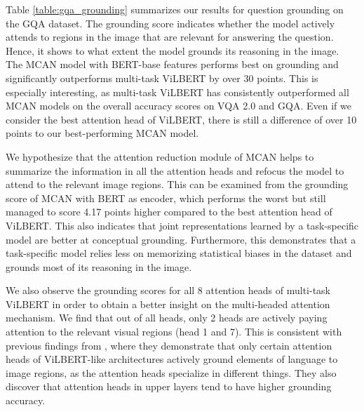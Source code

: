 \documentclass{article}
\begin{document}
Table \ref{table:gqa_grounding} summarizes our results for question grounding on the GQA dataset. The grounding score indicates whether the model actively attends to regions in the image that are relevant for answering the question. Hence, it shows to what extent the model grounds its reasoning in the image. The MCAN model with BERT-base features performs best on grounding and significantly outperforms multi-task ViLBERT by over 30 points. This is especially interesting, as multi-task ViLBERT has consistently outperformed all MCAN models on the overall accuracy scores on VQA 2.0 and GQA. Even if we consider the best attention head of ViLBERT, there is still a difference of over 10 points to our best-performing MCAN model.

We hypothesize that the attention reduction module of MCAN helps to summarize the information in all the attention heads and refocus the model to attend to the relevant image regions. This can be examined from the grounding score of MCAN with BERT as encoder, which performs the worst but still managed to score 4.17 points higher compared to the best attention head of ViLBERT. This also indicates that joint representations learned by a task-specific model are better at conceptual grounding. Furthermore, this demonstrates that a task-specific model relies less on memorizing statistical biases in the dataset and grounds most of its reasoning in the image.


We also observe the grounding scores for all 8 attention heads of multi-task ViLBERT in order to obtain a better insight on the multi-headed attention mechanism. We find that out of all heads, only 2 heads are actively paying attention to the relevant visual regions (head 1 and 7). This is consistent with previous findings from \citet{li2020bert}, where they demonstrate that only certain attention heads of ViLBERT-like architectures actively ground elements of language to image regions, as the attention heads specialize in different things. They also discover that attention heads in upper layers tend to have higher grounding accuracy. 
\end{document}

